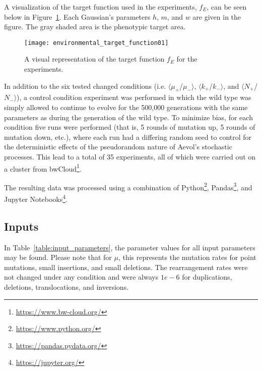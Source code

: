 A visualization of the target function used in the experiments, $f_E$, can be seen below in Figure~\ref{fig:target_function}. Each Gaussian's parameters $h$, $m$, and $w$ are given in the figure. The gray shaded area is the phenotypic target area.  

\begin{figure}[H]
	\centering
	\texttt{[image: environmental\_target\_function01]}
	\caption[Experimental target function]{A visual representation of the target function $f_E$ for the experiments.}
	\label{fig:target_function}
\end{figure}

 
In addition to the six tested changed conditions (i.e. $\langle\mu_+$/$\mu_-\rangle$, $\langle k_+$/$k_-\rangle$, and $\langle N_+$/$N_-\rangle$), a control condition experiment was performed in which the wild type was simply allowed to continue to evolve for the 500,000 generations with the same parameters as during the generation of the wild type. To minimize bias, for each condition five runs were performed (that is, 5 rounds of mutation up, 5 rounds of mutation down, etc.), where each run had a differing random seed to control for the deterministic effects of the pseudorandom nature of Aevol's stochastic processes. This lead to a total of 35 experiments, all of which were carried out on a cluster from bwCloud\footnote{\url{https://www.bw-cloud.org/}}. 

The resulting data was processed using a combination of Python\footnote{\url{https://www.python.org/}}, Pandas\footnote{\url{https://pandas.pydata.org/}}, and Jupyter Notebooks\footnote{\url{https://jupyter.org/}}.  

\subsection{Inputs}
In Table~\ref{table:input_parameters}, the parameter values for all input parameters may be found. Please note that for $\mu$, this represents the mutation rates for point mutations, small insertions, and small deletions. The rearrangement rates were not changed under any condition and were always $1e-6$ for duplications, deletions, translocations, and inversions. 

